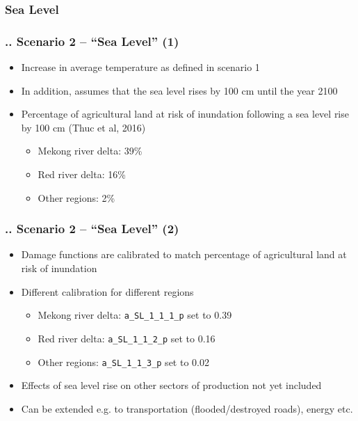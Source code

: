\documentclass[11pt,aspectratio=169]{beamer}
\begin{document}
\subsubsection{Sea Level}
\begin{frame}
\frametitle{{\thesection.\thesubsection.\thesubsubsection} Scenario 2 -- "`Sea Level"' (1)}
\begin{itemize}
\item Increase in average temperature as defined in scenario 1
\item In addition, assumes that the sea level rises by 100 cm until the year 2100 
\item Percentage of agricultural land at risk of inundation following a sea level rise by 100 cm (Thuc et al, 2016)
	\begin{itemize}
		\item Mekong river delta: 39\%
		\item Red river delta: 16\%
		\item Other regions: 2\%
	\end{itemize}
\end{itemize}
\end{frame}

\begin{frame}
\frametitle{{\thesection.\thesubsection.\thesubsubsection} Scenario 2 -- "`Sea Level"' (2)}
\begin{itemize}
\item Damage functions are calibrated to match percentage of agricultural land at risk of inundation
\item Different calibration for different regions
	\begin{itemize}
		\item Mekong river delta: \texttt{a\_SL\_1\_1\_1\_p} set to 0.39
		\item Red river delta: \texttt{a\_SL\_1\_1\_2\_p} set to 0.16
		\item Other regions: \texttt{a\_SL\_1\_1\_3\_p} set to 0.02
	\end{itemize}
	\item Effects of sea level rise on other sectors of production not yet included
	\item Can be extended e.g. to transportation (flooded/destroyed roads), energy etc.
\end{itemize}
\end{frame}
\end{document}
